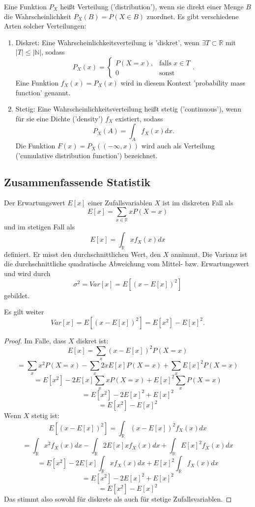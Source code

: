 \documentclass{article}
\begin{document}
Eine Funktion \(P_X\) heißt Verteilung ('distribution'), wenn sie direkt einer Menge \(B\) die Wahrscheinlichkeit \(P_X(B)=P(X\in B)\) zuordnet. Es gibt verschiedene Arten solcher Verteilungen:
\begin{enumerate}
    \item Diskret: Eine Wahrscheinlichkeitsverteilung is 'diskret', wenn \(\exists T\subset\mathbb R\) mit \(|T|\leq|\mathbb N|\), sodass\[
    P_X({x})= \left\{ \begin{array}{cc}
    P(X=x), &\text{falls } x\in T \\
    0&\text {sonst}
    \end{array} \right..
    \]
    Eine Funktion \(f_X(x)=P_X({x})\) wird in diesem Kontext 'probability mass function' genannt.
    \item Stetig: Eine Wahrscheinlichkeitsverteilung heißt stetig ('continuous'), wenn für sie eine Dichte ('density') \(f_X\) existiert, sodass \[
    P_X(A)=\int_Af_X(x)dx.
    \] Die Funktion \(F(x)=P_X((-\infty,x))\) wird auch als Verteilung ('cumulative distribution function') bezeichnet.
\end{enumerate}

\subsection{Zusammenfassende Statistik}
Der Erwartungswert \(E[x]\) einer Zufallsvariablen \(X\) ist im diskreten Fall als\[
E[x]=\sum\limits_{x \in\mathbb R}xP(X=x)
\]und im stetigen Fall als\[
E[x]=\int_{\mathbb R}xf_X(x)dx
\] definiert. Er misst den durchschnittlichen Wert, den \(X\) annimmt. Die Varianz ist die durchschnittliche quadratische Abweichung vom Mittel- bzw. Erwartungswert und wird durch\[
\sigma^2=Var[x] = E[(x-E[x])^2]
\]gebildet.

Es gilt weiter \[
Var[x] = E[(x-E[x])^2] = E[x^2]-E[x]^2.
\]
\begin{proof}
    Im Falle, dass \(X\) diskret ist:
    \[
    E[x]=\sum\limits_x(x-E[x])^2P(X=x)
    \]\[
    =\sum\limits_x x^2P(X=x)-\sum\limits_x 2xE[x]P(X=x)+\sum\limits_x E[x]^2P(X=x)
    \]\[
    =E[x^2]-2E[x]\sum\limits_x xP(X=x)+E[x]^2\sum\limits_x P(X=x)
    \]\[
    =E[x^2]-2E[x]^2+E[x]^2
    \]\[
    =E[x^2]-E[x]^2
    \]
    Wenn \(X\) stetig ist:
    \[
    E[(x-E[x])^2]=\int_{\mathbb R}(x-E[x])^2f_X(x)dx
    \]\[
    =\int_{\mathbb R}x^2f_X(x)dx - \int_{\mathbb R}2E[x]xf_X(x)dx + \int_{\mathbb R}E[x]^2f_X(x)dx
    \]\[
    =E[x^2] - 2E[x]\int_{\mathbb R}xf_X(x)dx + E[x]^2\int_{\mathbb R}f_X(x)dx
    \]\[
    =E[x^2]-2E[x]^2+E[x]^2
    \]\[
    =E[x^2]-E[x]^2
    \]
    Das stimmt also sowohl für diskrete als auch für stetige Zufallsvariablen.
\end{proof}
\end{document}

